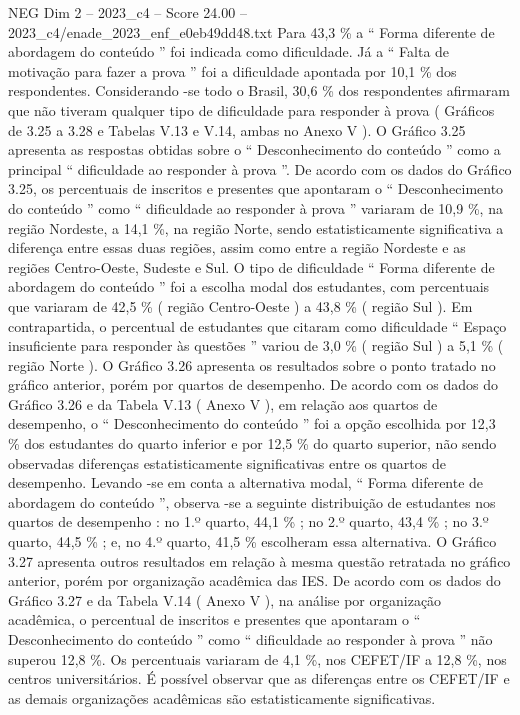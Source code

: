 \begin{textsample}{NEG Dim 2 – 2023\_c4 – Score 24.00 – 2023\_c4/enade\_2023\_enf\_e0eb49dd48.txt}
Para 43,3 \% a “ Forma diferente de abordagem do conteúdo ” foi indicada como dificuldade.
Já a “ Falta de motivação para fazer a prova ” foi a dificuldade apontada por 10,1 \% dos respondentes.
Considerando -se todo o Brasil, 30,6 \% dos respondentes afirmaram que não tiveram qualquer tipo de dificuldade para responder à prova ( Gráficos de 3.25 a 3.28 e Tabelas V.13 e V.14, ambas no Anexo V ).
O Gráfico 3.25 apresenta as respostas obtidas sobre o “ Desconhecimento do conteúdo ” como a principal “ dificuldade ao responder à prova ”.
De acordo com os dados do Gráfico 3.25, os percentuais de inscritos e presentes que apontaram o “ Desconhecimento do conteúdo ” como “ dificuldade ao responder à prova ” variaram de 10,9 \%, na região Nordeste, a 14,1 \%, na região Norte, sendo estatisticamente significativa a diferença entre essas duas regiões, assim como entre a região Nordeste e as regiões Centro-Oeste, Sudeste e Sul.
O tipo de dificuldade “ Forma diferente de abordagem do conteúdo ” foi a escolha modal dos estudantes, com percentuais que variaram de 42,5 \% ( região Centro-Oeste ) a 43,8 \% ( região Sul ).
Em contrapartida, o percentual de estudantes que citaram como dificuldade “ Espaço insuficiente para responder às questões ” variou de 3,0 \% ( região Sul ) a 5,1 \% ( região Norte ).
O Gráfico 3.26 apresenta os resultados sobre o ponto tratado no gráfico anterior, porém por quartos de desempenho.
De acordo com os dados do Gráfico 3.26 e da Tabela V.13 ( Anexo V ), em relação aos quartos de desempenho, o “ Desconhecimento do conteúdo ” foi a opção escolhida por 12,3 \% dos estudantes do quarto inferior e por 12,5 \% do quarto superior, não sendo observadas diferenças estatisticamente significativas entre os quartos de desempenho.
Levando -se em conta a alternativa modal, “ Forma diferente de abordagem do conteúdo ”, observa -se a seguinte distribuição de estudantes nos quartos de desempenho : no 1.º quarto, 44,1 \% ; no 2.º quarto, 43,4 \% ; no 3.º quarto, 44,5 \% ; e, no 4.º quarto, 41,5 \% escolheram essa alternativa.
O Gráfico 3.27 apresenta outros resultados em relação à mesma questão retratada no gráfico anterior, porém por organização acadêmica das IES.
De acordo com os dados do Gráfico 3.27 e da Tabela V.14 ( Anexo V ), na análise por organização acadêmica, o percentual de inscritos e presentes que apontaram o “ Desconhecimento do conteúdo ” como “ dificuldade ao responder à prova ” não superou 12,8 \%.
Os percentuais variaram de 4,1 \%, nos CEFET/IF a 12,8 \%, nos centros universitários.
É possível observar que as diferenças entre os CEFET/IF e as demais organizações acadêmicas são estatisticamente significativas.

\end{textsample}

